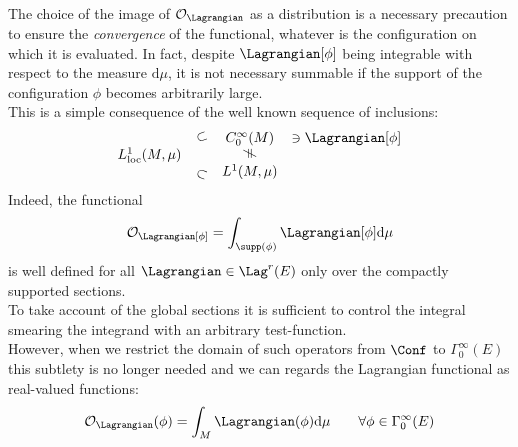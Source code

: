 \documentclass[Main]{subfiles}
\begin{document}
	
	\vspace{3mm}
	\begin{observation}
		The choice of the image of $\mathcal{O}_\Lagrangian$ as a distribution is a necessary precaution to ensure the \emph{convergence} of the functional, whatever is the configuration on which it is evaluated.
		In fact, despite $\Lagrangian [ \phi ]$  being integrable with respect to the measure $\textrm{d}\mu$, it is not necessary summable if the support of the configuration $\phi$ becomes arbitrarily large.
		\\
		This is a simple consequence of the well known sequence of inclusions:
		\begin{displaymath}
			\begin{array}{cccl}
				&\rotatebox{20}{$\subset$}& C^\infty_0(M) & \ni \Lagrangian [ \phi ]  \\
				L^1_{\textrm{loc}}(M,\mu) & & \rotatebox{90}{$\neq$} & \\
				&\rotatebox{-20}{$\subset$}& L^1(M,\mu) & \\
			\end{array}
		\end{displaymath}
		Indeed, the functional
		\begin{displaymath}
			\mathcal{O}_\Lagrangian [\phi]= \int_{\supp(\phi)} \Lagrangian [\phi] \textrm{d}\mu
		\end{displaymath}
		is well defined for all $\Lagrangian \in \Lag^r(E)$ only over the compactly supported sections. 
		\\
		To take account of the global sections it is sufficient to control the integral smearing the integrand with an arbitrary test-function.
	\\
	However, when we restrict the domain of such operators from $\Conf$ to $\Gamma_0^\infty(E)$ this subtlety is no longer needed and we can regards the Lagrangian functional as real-valued functions:
	\begin{displaymath}
			\mathcal{O}_\Lagrangian (\phi) = \int_M \Lagrangian (\phi) \textrm{d}\mu \qquad \forall \phi \in \Gamma_0^\infty(E)
	\end{displaymath}
	\end{observation}
	
\end{document}
